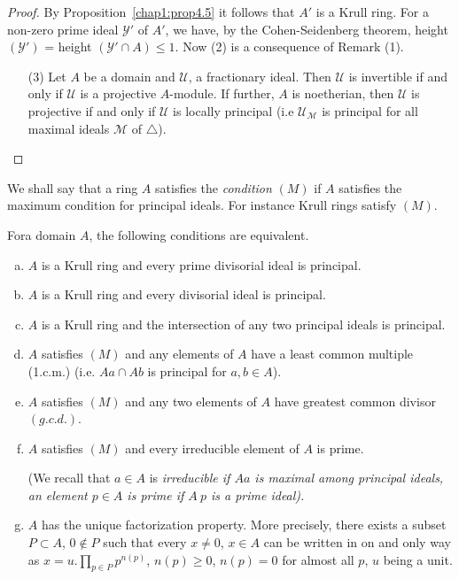 \begin{proof}
By Proposition~\ref{chap1:prop4.5} it follows that $A'$ is a Krull
ring. For a 
non-zero prime ideal $\mathscr{Y}' $ of $A'$, we have, by the
Cohen-Seidenberg theorem, height $(\mathscr{Y}')$ = height
$(\mathscr{Y} ' \cap A) \le 1$. Now (2) is a consequence of Remark
(1). 
\begin{enumerate}
\item [(3)] Let $A$ be a domain and $\mathscr{U}$, a fractionary
  ideal. Then $\mathscr{U}$ is invertible if and only if $\mathscr{U}$
  is a projective $A$-module. If further, $A$ is noetherian, then
  $\mathscr{U}$ is projective if and only if $\mathscr{U}$
  is locally principal (i.e $\mathscr{U}_\mathscr{M}$ is principal for
  all maximal ideals $\mathscr{M}$ of $\triangle$). 
\end{enumerate}
\end{proof}  
  
  We shall say that a ring $A$ satisfies the \textit{condition} $(M)$
  if $A$ satisfies the maximum condition for principal ideals. For
  instance Krull rings satisfy $(M)$. 
  
\setcounter{theorem}{2}
 \begin{theorem}\label{chap1:thm5.3} %
 For\pageoriginale a domain $A$, the following conditions are
 equivalent. 
 \begin{enumerate}[a)]
\item $A$ is a Krull ring and every prime divisorial ideal is
  principal.

\item $A$ is a Krull ring and every divisorial ideal is
  principal. 

\item $A$ is a Krull ring and the intersection of any two principal
  ideals is principal.

\item $A$ satisfies $(M)$ and any elements of $A$ have a least
  common multiple (1.c.m.) (i.e. $A a \cap Ab$ is principal for $a,
  b \in A$). 

\item $A$ satisfies $(M)$ and any two elements of $A$ have
  greatest common divisor $(g.c.d.)$. 

\item $A$ satisfies $(M)$ and every irreducible element of $A$
  is prime. 

(We recall that $a \in A$ is \em{irreducible} if $Aa$ is maximal
  among principal ideals, an element $p \in A$ is \em{prime} if $A~ p$ is
  a prime ideal). 

\item $A$ has the unique factorization property. More precisely, 
  there exists a subset $P \subset A$, $0 \notin P$ such that every $x
  \neq 0$, $x \in A$ can be written in on and only way as $x =
  u. \prod\limits_{p \in P} p^{n(p) }$, $n(p) \ge 0$, $n(p) = 0$ for
  almost all $p$, $u$ being a unit.
 \end{enumerate} 
 \end{theorem}  
 
